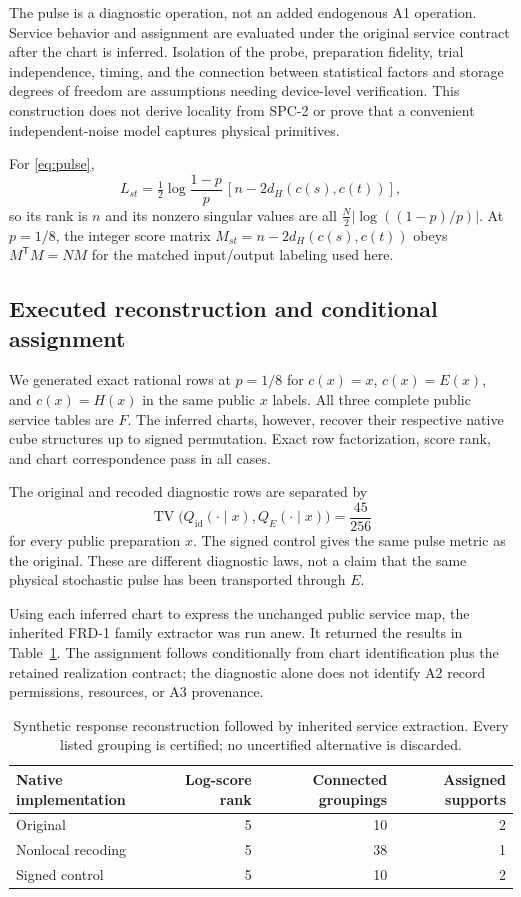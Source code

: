 \documentclass[11pt]{article}
\theoremstyle{definition}\newtheorem{definition}[theorem]{Definition}
\theoremstyle{remark}\newtheorem{remark}[theorem]{Remark}
\newcommand{\TV}{\operatorname{TV}}
\begin{document}
The pulse is a diagnostic operation, not an added endogenous A1 operation. Service behavior and assignment are evaluated under the original service contract after the chart is inferred. Isolation of the probe, preparation fidelity, trial independence, timing, and the connection between statistical factors and storage degrees of freedom are assumptions needing device-level verification. This construction does not derive locality from SPC-2 or prove that a convenient independent-noise model captures physical primitives.

For \eqref{eq:pulse},
\begin{equation}
L_{st}=\tfrac12\log\frac{1-p}{p}\,[n-2d_H(c(s),c(t))],
\end{equation}
so its rank is $n$ and its nonzero singular values are all $\frac N2|\log((1-p)/p)|$. At $p=1/8$, the integer score matrix $M_{st}=n-2d_H(c(s),c(t))$ obeys $M^{\mathsf T}M=NM$ for the matched input/output labeling used here.

\subsection{Executed reconstruction and conditional assignment}
We generated exact rational rows at $p=1/8$ for $c(x)=x$, $c(x)=E(x)$, and $c(x)=H(x)$ in the same public $x$ labels. All three complete public service tables are $F$. The inferred charts, however, recover their respective native cube structures up to signed permutation. Exact row factorization, score rank, and chart correspondence pass in all cases.

The original and recoded diagnostic rows are separated by
\begin{equation}
\TV\bigl(Q_{\mathrm{id}}(\cdot\mid x),Q_E(\cdot\mid x)\bigr)=\frac{45}{256}
\end{equation}
for every public preparation $x$. The signed control gives the same pulse metric as the original. These are different diagnostic laws, not a claim that the same physical stochastic pulse has been transported through $E$.

Using each inferred chart to express the unchanged public service map, the inherited FRD-1 family extractor was run anew. It returned the results in Table~\ref{tab:chart}. The assignment follows conditionally from chart identification plus the retained realization contract; the diagnostic alone does not identify A2 record permissions, resources, or A3 provenance.
\begin{table}[ht]
\centering
\caption{Synthetic response reconstruction followed by inherited service extraction. Every listed grouping is certified; no uncertified alternative is discarded.}\label{tab:chart}
\begin{tabular}{lrrr}\toprule
Native implementation & Log-score rank & Connected groupings & Assigned supports\\\midrule
Original &5&10&2\\
Nonlocal recoding &5&38&1\\
Signed control &5&10&2\\\bottomrule
\end{tabular}
\end{table}
\end{document}
